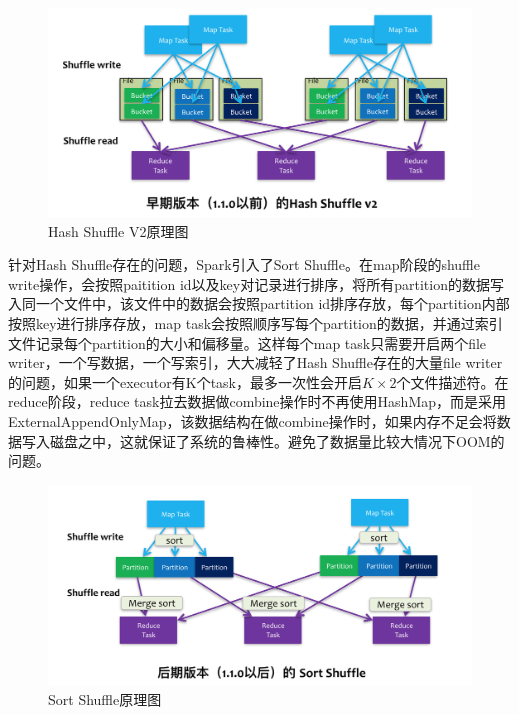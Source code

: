 \begin{figure}[htbp]
    \centering
    \includegraphics[width=1\textwidth]{Img/spark-shuffle-v2.png}
    \caption{Hash Shuffle V2原理图}
    \label{fig:shuffle-v2}
\end{figure}


针对Hash Shuffle存在的问题，Spark引入了Sort Shuffle。在map阶段的shuffle write操作，会按照paitition id以及key对记录进行排序，将所有partition的数据写入同一个文件中，该文件中的数据会按照partition id排序存放，每个partition内部按照key进行排序存放，map task会按照顺序写每个partition的数据，并通过索引文件记录每个partition的大小和偏移量。这样每个map task只需要开启两个file writer，一个写数据，一个写索引，大大减轻了Hash Shuffle存在的大量file writer的问题，如果一个executor有K个task，最多一次性会开启$K \times 2$个文件描述符。在reduce阶段，reduce task拉去数据做combine操作时不再使用HashMap，而是采用ExternalAppendOnlyMap，该数据结构在做combine操作时，如果内存不足会将数据写入磁盘之中，这就保证了系统的鲁棒性。避免了数据量比较大情况下OOM的问题。


\begin{figure}[htbp]
    \centering
    \includegraphics[width=1\textwidth]{Img/sort-shuffle.png}
    \caption{Sort Shuffle原理图}
    \label{fig:sort-shuffle}
\end{figure}



